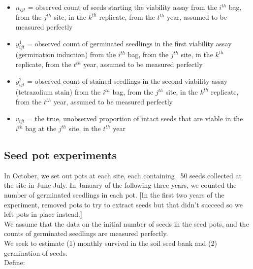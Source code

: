 \documentclass[12pt, oneside]{article}   	%
\begin{document}
\begin{itemize}
	\item $n_{ijt}$ = observed count of seeds starting the viability assay from the $i^{th}$ bag, from the $j^{th}$ site, in the $k^{th}$ replicate, from the $t^{th}$ year, assumed to be measured perfectly 
	\item $y^1_{ijt}$ =  observed count of germinated seedlings in the first viability assay (germination induction) from the $i^{th}$ bag, from the $j^{th}$ site, in the $k^{th}$ replicate, from the $t^{th}$ year, assumed to be measured perfectly
	\item $y^2_{ijt}$ =  observed count of stained seedlings in the second viability assay (tetrazolium stain) from the $i^{th}$ bag, from the $j^{th}$ site, in the $k^{th}$ replicate, from the $t^{th}$ year, assumed to be measured perfectly
	\item $v_{ijt}$ = the true, unobserved proportion of intact seeds that are viable in the $i^{th}$ bag at the $j^{th}$ site, in the $t^{th}$ year
\end{itemize}

\subsection*{Seed pot experiments}
In October, we set out pots at each site, each containing ~50 seeds collected at the site in June-July. In January of the following three years, we counted the number of germinated seedlings in each pot. [In the first two years of the experiment, removed pots to try to extract seeds but that didn't succeed so we left pots in place instead.] \\

We assume that the data on the initial number of seeds in the seed pots, and the counts of germinated seedlings are measured perfectly. \\

We seek to estimate (1) monthly survival in the soil seed bank and (2) germination of seeds. \\

Define:
\end{document}
